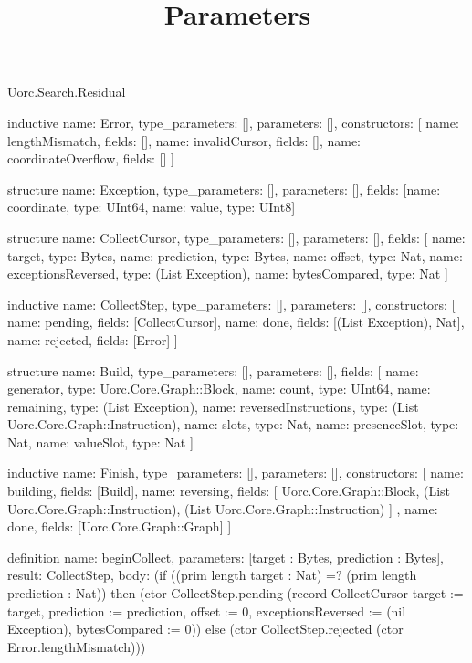 \begin{lexlean}{Uorc.Search.Residual}
\title{Parameters}
\begin{semanticmodule}
inductive{
  name: Error,
  type_parameters: [],
  parameters: [],
  constructors: [
    {name: lengthMismatch, fields: []},
    {name: invalidCursor, fields: []},
    {name: coordinateOverflow, fields: []}
  ]
}

structure{
  name: Exception,
  type_parameters: [],
  parameters: [],
  fields: [{name: coordinate, type: UInt64}, {name: value, type: UInt8}]
}

structure{
  name: CollectCursor,
  type_parameters: [],
  parameters: [],
  fields: [
    {name: target, type: Bytes},
    {name: prediction, type: Bytes},
    {name: offset, type: Nat},
    {name: exceptionsReversed, type: (List Exception)},
    {name: bytesCompared, type: Nat}
  ]
}

inductive{
  name: CollectStep,
  type_parameters: [],
  parameters: [],
  constructors: [
    {name: pending, fields: [CollectCursor]},
    {name: done, fields: [(List Exception), Nat]},
    {name: rejected, fields: [Error]}
  ]
}

structure{
  name: Build,
  type_parameters: [],
  parameters: [],
  fields: [
    {name: generator, type: Uorc.Core.Graph::Block},
    {name: count, type: UInt64},
    {name: remaining, type: (List Exception)},
    {name: reversedInstructions, type: (List Uorc.Core.Graph::Instruction)},
    {name: slots, type: Nat},
    {name: presenceSlot, type: Nat},
    {name: valueSlot, type: Nat}
  ]
}

inductive{
  name: Finish,
  type_parameters: [],
  parameters: [],
  constructors: [
    {name: building, fields: [Build]},
    {
      name: reversing,
      fields: [
        Uorc.Core.Graph::Block,
        (List Uorc.Core.Graph::Instruction),
        (List Uorc.Core.Graph::Instruction)
      ]
    },
    {name: done, fields: [Uorc.Core.Graph::Graph]}
  ]
}

definition{
  name: beginCollect,
  parameters: [target : Bytes, prediction : Bytes],
  result: CollectStep,
  body: (if ((prim length target : Nat) =? (prim length prediction : Nat)) then (ctor CollectStep.pending (record CollectCursor {target := target, prediction := prediction, offset := 0, exceptionsReversed := (nil Exception), bytesCompared := 0})) else (ctor CollectStep.rejected (ctor Error.lengthMismatch)))
}


\end{semanticmodule}
\end{lexlean}
